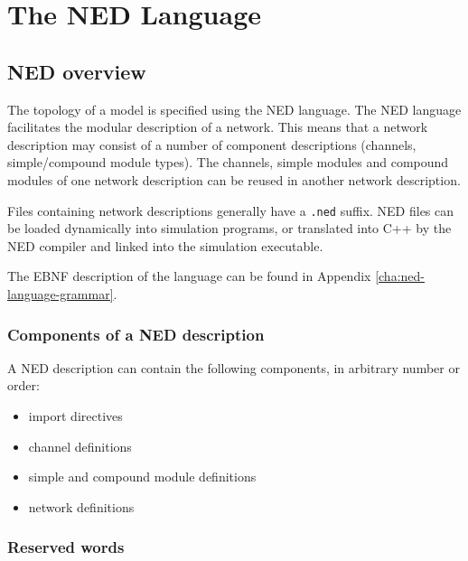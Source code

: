 \chapter{The NED Language}
\label{cha:the-ned-language}


\section{NED overview}

The topology of a model is specified using
the NED language.
The NED language facilitates the modular description of a network. 
This means that a network description may consist
of a number of component descriptions (channels,
simple/compound module
types). The channels, simple modules and compound
modules of one network description can be reused in another network
description.

Files containing network descriptions generally have a \texttt{.ned}
suffix. NED files can be loaded dynamically into simulation programs,
or translated into C++ by the NED compiler and linked into
the simulation executable.

The EBNF description of the language can be found in Appendix
\ref{cha:ned-language-grammar}.


\subsection{Components of a NED description}

A NED description can contain the following components, in arbitrary
number or order:
\begin{itemize}
  \item{import directives}
  \item{channel definitions}
  \item{simple and compound module definitions}
  \item{network definitions}
\end{itemize}


\subsection{Reserved words}

